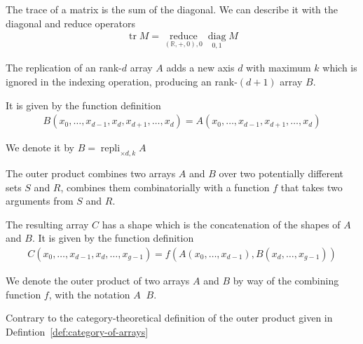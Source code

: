 \documentclass{DIKU-report-variant}
\newcommand\mrm[1]{\mathrm{#1}}
\newcommand\brm[1]{\bm{\mrm{#1}}}
\newcommand\Real{\mathbb{R}}
\newcommand\reduce{\operatorname*{\brm{reduce}}}
\newcommand\diag{\operatorname*{\brm{diag}}}
\newcommand\repli{\operatorname*{\brm{repli}}}
\newcommand\oprodby[1]{\mathop{\coprod_{#1}}}
\begin{document}
\begin{example}
  \label{ex:trace}
  The trace of a matrix is the sum of the diagonal. We can describe it with the diagonal
  and reduce operators
  \begin{align*}
    \operatorname*{\brm{tr}} M = \reduce_{(\Real,+,0),0} \diag_{0,1} M
  \end{align*}
\end{example}

\begin{definition}
  \label{def:replication}
  The replication of an rank-\(d\) array \(A\) adds a new axis \(d\) with maximum \(k\)
  which is ignored in the indexing operation, producing an rank-\((d+1)\) array \(B\).

  It is given by the function definition
  \begin{align*}
    B(x_0, \dots, x_{d-1}, x_d, x_{d+1}, \dots, x_{d}) = A(x_0, \dots, x_{d-1}, x_{d+1}, \dots, x_d)
  \end{align*}

  We denote it by \(B = \repli_{\times d, k} A\)
\end{definition}

\begin{definition}
  \label{def:outer-product}
  The outer product combines two arrays \(A\) and \(B\) over
  two potentially different sets \(S\) and \(R\), combines
  them combinatorially with a function \(f\) that takes two
  arguments from \(S\) and \(R\).

  The resulting array \(C\) has a shape which is the concatenation
  of the shapes of \(A\) and \(B\). It is given by the function definition
  \begin{align*}
    C(x_0,\dots,x_{d-1},x_d,\dots,x_{g-1}) = f(A(x_0,\dots,x_{d-1}), B(x_d,\dots,x_{g-1}))
  \end{align*}

  We denote the outer product of two arrays \(A\) and \(B\) by way of the combining
  function \(f\), with the notation \(A \oprodby f B\).
\end{definition}

\begin{remark}
  Contrary to the category-theoretical definition of the outer product given in
  Defintion~\ref{def:category-of-arrays}
\end{remark}
\end{document}
